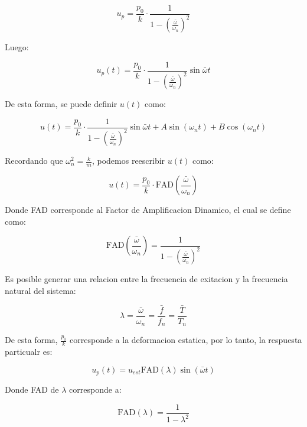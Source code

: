 \documentclass{article}  %
\begin{document}
\begin{equation}
    u_p = \frac{p_0}{k} \cdot \frac{1}{1-(\frac{\bar{\omega}}{\omega_n})^2}
\end{equation}

Luego:

\begin{equation}
    u_p(t) = \frac{p_0}{k} \cdot \frac{1}{1-(\frac{\bar{\omega}}{\omega_n})^2} \sin{\bar{\omega} t }
\end{equation}

De esta forma, se puede definir $u(t)$ como:

\begin{equation}
    u(t) = \frac{p_0}{k} \cdot \frac{1}{1-(\frac{\bar{\omega}}{\omega_n})^2} \sin{\bar{\omega} t } + A \sin(\omega_n t) + B \cos(\omega_n t)
\end{equation}

Recordando que $\omega_n^2 = \frac{k}{m}$, podemos reescribir $u(t)$ como:

\begin{equation}
    u(t) = \frac{p_0}{k} \cdot \text{FAD}(\frac{\bar\omega}{\omega_n})
\end{equation}

Donde FAD corresponde al Factor de Amplificacion Dinamico, el cual se define como:

\begin{equation}
    \text{FAD}(\frac{\bar\omega}{\omega_n}) = \frac{1}{1-(\frac{\bar{\omega}}{\omega_n})^2}
\end{equation}

Es posible generar una relacion entre la frecuencia de exitacion y la frecuencia natural del sistema:

\begin{equation}
    \lambda = \frac{\bar{\omega}}{\omega_n} = \frac{\bar{f}}{f_n} = \frac{\bar{T}}{T_n}
\end{equation}

De esta forma, $\frac{p_0}{k}$ corresponde a la deformacion estatica, por lo tanto, la respuesta particualr es:

\begin{equation}
    u_p(t) = u_{est} \text{FAD}(\lambda) \sin(\bar{\omega} t)
\end{equation}

Donde FAD de $\lambda$ corresponde a:

\begin{equation}
    \text{FAD}(\lambda) = \frac{1}{1-\lambda^2}
\end{equation}
\end{document}
